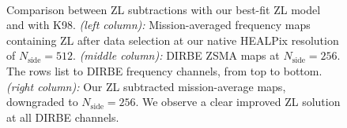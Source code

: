 \documentclass[twocolumn]{aa}
\begin{document}
\begin{figure}
    \\

    \caption{Comparison between ZL subtractions with our best-fit ZL model and with K98. 
    \textit{(left column):} Mission-averaged frequency maps containing ZL after data selection at our native HEALPix resolution 
    of $N_\mathrm{side} = 512$. \textit{(middle column):} DIRBE ZSMA maps
    at $N_\mathrm{side} = 256$. The rows list to DIRBE frequency channels, from top to 
    bottom. \textit{(right column):} Our ZL subtracted mission-average 
    maps, downgraded to $N_\mathrm{side} = 256$. We observe a clear improved ZL solution at all DIRBE channels.
    }    
    \label{fig:dr2-zsma-compare2}
\end{figure}
\end{document}
